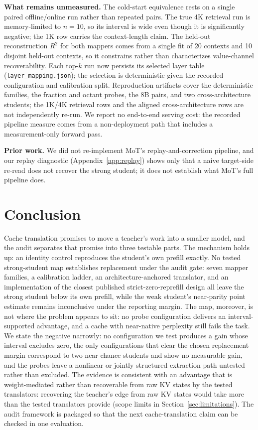 \documentclass[10pt]{article}
\begin{document}
\textbf{What remains unmeasured.} The cold-start equivalence rests on a single
paired offline/online run rather than repeated pairs. The true 4K retrieval run
is memory-limited to $n{=}10$, so its interval is wide even though it is
significantly negative; the 1K row carries the context-length claim. The
held-out reconstruction
$R^2$ for both mappers comes from a single fit of 20 contexts and 10 disjoint
held-out contexts, so it constrains rather than characterizes value-channel
recoverability. Each top-$k$ run now persists its selected layer table
(\texttt{layer\_mapping.json}); the selection is deterministic given the
recorded configuration and calibration split. Reproduction artifacts cover the
deterministic families, the fraction and octant probes, the 8B pairs, and two
cross-architecture students; the 1K/4K retrieval rows and the aligned
cross-architecture rows are not independently re-run. We report no end-to-end
serving cost: the recorded pipeline measure comes from a non-deployment path
that includes a measurement-only forward pass.

\textbf{Prior work.} We did not re-implement MoT's replay-and-correction
pipeline, and our replay diagnostic (Appendix~\ref{app:replay}) shows only that
a naive target-side re-read does not recover the strong student; it does not
establish what MoT's full pipeline does.

\section{Conclusion}
Cache translation promises to move a teacher's work into a smaller model,
and the audit separates that promise into three testable parts. The
mechanism holds up: an identity control reproduces the student's own prefill
exactly. No tested strong-student map establishes replacement under the audit gate: seven mapper families, a
calibration ladder, an architecture-anchored translator, and an implementation
of the closest published strict-zero-reprefill design all leave the strong student below its own
prefill, while the weak student's near-parity point estimate remains
inconclusive under the reporting margin. The map, moreover, is not where the
problem appears to sit: no probe configuration delivers an interval-supported
advantage, and a cache with near-native perplexity still fails the
task. We state the negative narrowly: no configuration we test produces a gain
whose interval excludes zero, the only configurations that clear the chosen replacement margin correspond to two near-chance
students and show no measurable gain, and the probes leave
a nonlinear or jointly structured extraction path untested rather than
excluded. The evidence is consistent with an advantage that is weight-mediated
rather than recoverable from raw KV states by the tested translators:
recovering the teacher's edge from raw KV states would take
more than the tested translators provide (scope limits in
Section~\ref{sec:limitations}). The audit framework is
packaged so that the next cache-translation claim can be checked in one
evaluation.
\end{document}

